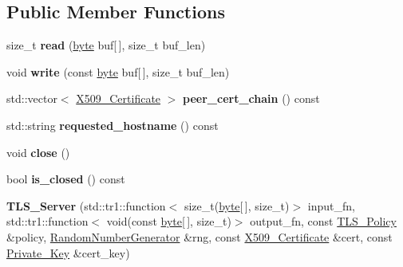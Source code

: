 \subsection*{Public Member Functions}
\begin{DoxyCompactItemize}
\item 
\hypertarget{classBotan_1_1TLS__Server_ab839720c8826f40d5813f297e36be526}{size\-\_\-t {\bfseries read} (\hyperlink{namespaceBotan_a7d793989d801281df48c6b19616b8b84}{byte} buf\mbox{[}$\,$\mbox{]}, size\-\_\-t buf\-\_\-len)}\label{classBotan_1_1TLS__Server_ab839720c8826f40d5813f297e36be526}

\item 
\hypertarget{classBotan_1_1TLS__Server_a7c083d0e35200d2f00fff09853f56f97}{void {\bfseries write} (const \hyperlink{namespaceBotan_a7d793989d801281df48c6b19616b8b84}{byte} buf\mbox{[}$\,$\mbox{]}, size\-\_\-t buf\-\_\-len)}\label{classBotan_1_1TLS__Server_a7c083d0e35200d2f00fff09853f56f97}

\item 
\hypertarget{classBotan_1_1TLS__Server_ad262548d61102f0bfaa39cff636845f5}{std\-::vector$<$ \hyperlink{classBotan_1_1X509__Certificate}{X509\-\_\-\-Certificate} $>$ {\bfseries peer\-\_\-cert\-\_\-chain} () const }\label{classBotan_1_1TLS__Server_ad262548d61102f0bfaa39cff636845f5}

\item 
\hypertarget{classBotan_1_1TLS__Server_a82dcc8dcd14de2bfab0a93e656c6c201}{std\-::string {\bfseries requested\-\_\-hostname} () const }\label{classBotan_1_1TLS__Server_a82dcc8dcd14de2bfab0a93e656c6c201}

\item 
\hypertarget{classBotan_1_1TLS__Server_abc1a19a0388d27cd75d9e259850cecc8}{void {\bfseries close} ()}\label{classBotan_1_1TLS__Server_abc1a19a0388d27cd75d9e259850cecc8}

\item 
\hypertarget{classBotan_1_1TLS__Server_a156dba7ba26eb556253aba25b2dceca1}{bool {\bfseries is\-\_\-closed} () const }\label{classBotan_1_1TLS__Server_a156dba7ba26eb556253aba25b2dceca1}

\item 
\hypertarget{classBotan_1_1TLS__Server_a92738eda710b4b14160e87727c8e334e}{{\bfseries T\-L\-S\-\_\-\-Server} (std\-::tr1\-::function$<$ size\-\_\-t(\hyperlink{namespaceBotan_a7d793989d801281df48c6b19616b8b84}{byte}\mbox{[}$\,$\mbox{]}, size\-\_\-t)$>$ input\-\_\-fn, std\-::tr1\-::function$<$ void(const \hyperlink{namespaceBotan_a7d793989d801281df48c6b19616b8b84}{byte}\mbox{[}$\,$\mbox{]}, size\-\_\-t)$>$ output\-\_\-fn, const \hyperlink{classBotan_1_1TLS__Policy}{T\-L\-S\-\_\-\-Policy} \&policy, \hyperlink{classBotan_1_1RandomNumberGenerator}{Random\-Number\-Generator} \&rng, const \hyperlink{classBotan_1_1X509__Certificate}{X509\-\_\-\-Certificate} \&cert, const \hyperlink{classBotan_1_1Private__Key}{Private\-\_\-\-Key} \&cert\-\_\-key)}\label{classBotan_1_1TLS__Server_a92738eda710b4b14160e87727c8e334e}

\end{DoxyCompactItemize}


